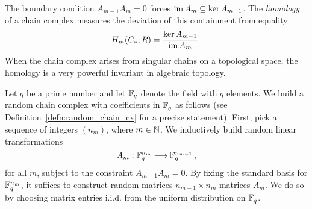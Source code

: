 The boundary condition $A_{m-1}A_m=0$ forces $\operatorname{\mathrm{im}} A_m \subseteq \ker A_{m-1}$.
The {\em homology} of a chain complex measures the deviation of this containment
from equality
\begin{equation}
  \label{eqn:hom}
  H_m(C_*;R) = \frac{\ker A_{m-1}}{\operatorname{\mathrm{im}} A_m} \, .
\end{equation}
When the chain complex arises from singular chains on a topological
space, the homology is a very powerful invariant in algebraic topology.
%


Let $q$ be a prime number and let $\mathbb{F}_q$ denote the field with $q$ elements.  We
build a random chain complex with coefficients in $\mathbb{F}_q^{}$ as follows (see
Definition~\ref{defn:random_chain_cx} for a precise statement). First, pick a
 sequence of integers $(n_m)$, where $m \in \mathbb{N}$. We
inductively build random linear transformations 
\[
  A_m : \mathbb{F}_q^{n_m} \longrightarrow \mathbb{F}_q^{n_{m-1}} \, ,
\]
for all $m$, subject to the constraint $A_{m-1} A_m = 0$. By fixing the
standard basis for $\mathbb{F}_q^{n_m}$, it suffices to construct random
matrices $n_{m-1} \times n_m$ matrices $A_m$. We do so by 
choosing matrix entries i.i.d. from the uniform distribution on
$\mathbb{F}_q^{}$. 

